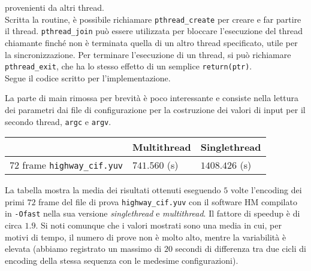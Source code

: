 provenienti da altri thread. \\
Scritta la routine, è possibile richiamare \verb|pthread_create| per creare e 
far partire il thread. \verb|pthread_join| può essere utilizzata per bloccare 
l'esecuzione del thread chiamante finché non è terminata quella di un altro 
thread specificato, utile per la sincronizzazione. Per terminare l'esecuzione 
di un thread, si può richiamare \verb|pthread_exit|, che ha lo stesso effetto 
di un semplice \verb|return(ptr)|.\\
Segue il codice scritto per l'implementazione.\\
\begin{center}

\end{center}
La parte di main rimossa per brevità è poco interessante e consiste nella 
lettura dei parametri dai file di configurazione per la costruzione dei valori 
di input per il secondo thread, \verb|argc| e \verb|argv|.
\begin{center}
	\begin{tabular}{l | l | l}
		& Multithread & Singlethread \\
		\hline
		$72$ frame \verb|highway_cif.yuv| & $741.560$ (s) & $1408.426$ (s)
	\end{tabular}
\end{center}
La tabella mostra la media dei risultati ottenuti eseguendo $5$ volte 
l'encoding dei primi $72$ frame del file di prova \verb|highway_cif.yuv| con il 
software HM compilato in \verb|-Ofast| nella sua versione \emph{singlethread} e 
\emph{multithread}. Il fattore di speedup è di circa $1.9$. Si noti comunque 
che i valori mostrati sono una media in cui, per motivi di tempo, il numero di 
prove non è molto alto, mentre la variabilità è elevata (abbiamo registrato un 
massimo di $20$ secondi di differenza tra due cicli di encoding della stessa 
sequenza con le medesime configurazioni).
